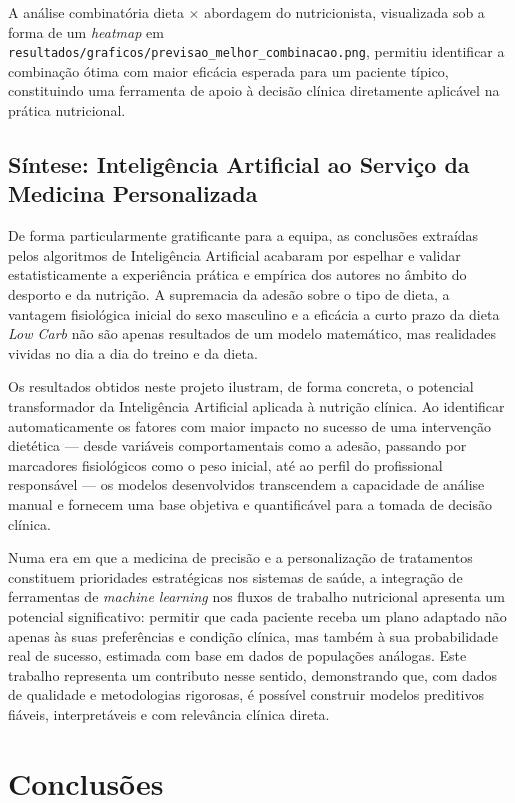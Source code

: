 A análise combinatória dieta $\times$ abordagem do nutricionista, visualizada sob a forma de um \textit{heatmap} em \texttt{resultados/graficos/previsao\_melhor\_combinacao.png}, permitiu identificar a combinação ótima com maior eficácia esperada para um paciente típico, constituindo uma ferramenta de apoio à decisão clínica diretamente aplicável na prática nutricional.

\subsection{S\'intese: Intelig\^encia Artificial ao Servi\c{c}o da Medicina Personalizada}


De forma particularmente gratificante para a equipa, as conclusões extraídas pelos algoritmos de Inteligência Artificial acabaram por espelhar e validar estatisticamente a experiência prática e empírica dos autores no âmbito do desporto e da nutrição. A supremacia da adesão sobre o tipo de dieta, a vantagem fisiológica inicial do sexo masculino e a eficácia a curto prazo da dieta \textit{Low Carb} não são apenas resultados de um modelo matemático, mas realidades vividas no dia a dia do treino e da dieta.

Os resultados obtidos neste projeto ilustram, de forma concreta, o potencial transformador da Inteligência Artificial aplicada à nutrição clínica.
Ao identificar automaticamente os fatores com maior impacto no sucesso de uma intervenção dietética --- desde variáveis comportamentais como a adesão, passando por marcadores fisiológicos como o peso inicial, até ao perfil do profissional responsável --- os modelos desenvolvidos transcendem a capacidade de análise manual e fornecem uma base objetiva e quantificável para a tomada de decisão clínica.

Numa era em que a medicina de precisão e a personalização de tratamentos constituem prioridades estratégicas nos sistemas de saúde, a integração de ferramentas de \textit{machine learning} nos fluxos de trabalho nutricional apresenta um potencial significativo: permitir que cada paciente receba um plano adaptado não apenas às suas preferências e condição clínica, mas também à sua probabilidade real de sucesso, estimada com base em dados de populações análogas. Este trabalho representa um contributo nesse sentido, demonstrando que, com dados de qualidade e metodologias rigorosas, é possível construir modelos preditivos fiáveis, interpretáveis e com relevância clínica direta.


\section{Conclus\~oes}
\label{sec:conclusoes}

